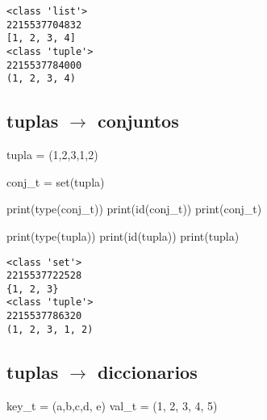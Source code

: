 \documentclass[
  letterpaper,
  DIV=11,
  numbers=noendperiod]{scrreprt}
\newenvironment{Shaded}{\begin{snugshade}}{\end{snugshade}}
\newcommand{\BuiltInTok}[1]{\textcolor[rgb]{0.00,0.23,0.31}{#1}}
\newcommand{\DecValTok}[1]{\textcolor[rgb]{0.68,0.00,0.00}{#1}}
\newcommand{\NormalTok}[1]{\textcolor[rgb]{0.00,0.23,0.31}{#1}}
\newcommand{\OperatorTok}[1]{\textcolor[rgb]{0.37,0.37,0.37}{#1}}
\newcommand{\StringTok}[1]{\textcolor[rgb]{0.13,0.47,0.30}{#1}}
\begin{document}
\begin{verbatim}
<class 'list'>
2215537704832
[1, 2, 3, 4]
<class 'tuple'>
2215537784000
(1, 2, 3, 4)
\end{verbatim}

\subsection{\texorpdfstring{tuplas \(\to\)
conjuntos}{tuplas \textbackslash to conjuntos}}\label{tuplas-to-conjuntos}

\begin{Shaded}
\begin{Highlighting}[]
\NormalTok{tupla }\OperatorTok{=}\NormalTok{ (}\DecValTok{1}\NormalTok{,}\DecValTok{2}\NormalTok{,}\DecValTok{3}\NormalTok{,}\DecValTok{1}\NormalTok{,}\DecValTok{2}\NormalTok{)}
\end{Highlighting}
\end{Shaded}

\begin{Shaded}
\begin{Highlighting}[]
\NormalTok{conj\_t }\OperatorTok{=} \BuiltInTok{set}\NormalTok{(tupla)}

\BuiltInTok{print}\NormalTok{(}\BuiltInTok{type}\NormalTok{(conj\_t))}
\BuiltInTok{print}\NormalTok{(}\BuiltInTok{id}\NormalTok{(conj\_t))}
\BuiltInTok{print}\NormalTok{(conj\_t)}

\BuiltInTok{print}\NormalTok{(}\BuiltInTok{type}\NormalTok{(tupla))}
\BuiltInTok{print}\NormalTok{(}\BuiltInTok{id}\NormalTok{(tupla))}
\BuiltInTok{print}\NormalTok{(tupla)}
\end{Highlighting}
\end{Shaded}

\begin{verbatim}
<class 'set'>
2215537722528
{1, 2, 3}
<class 'tuple'>
2215537786320
(1, 2, 3, 1, 2)
\end{verbatim}

\subsection{\texorpdfstring{tuplas \(\to\)
diccionarios}{tuplas \textbackslash to diccionarios}}\label{tuplas-to-diccionarios}

\begin{Shaded}
\begin{Highlighting}[]
\NormalTok{key\_t }\OperatorTok{=}\NormalTok{ (}\StringTok{\textquotesingle{}a\textquotesingle{}}\NormalTok{,}\StringTok{\textquotesingle{}b\textquotesingle{}}\NormalTok{,}\StringTok{\textquotesingle{}c\textquotesingle{}}\NormalTok{,}\StringTok{\textquotesingle{}d\textquotesingle{}}\NormalTok{, }\StringTok{\textquotesingle{}e\textquotesingle{}}\NormalTok{)}
\NormalTok{val\_t }\OperatorTok{=}\NormalTok{ (}\DecValTok{1}\NormalTok{, }\DecValTok{2}\NormalTok{, }\DecValTok{3}\NormalTok{, }\DecValTok{4}\NormalTok{, }\DecValTok{5}\NormalTok{)}
\end{Highlighting}
\end{Shaded}
\end{document}
